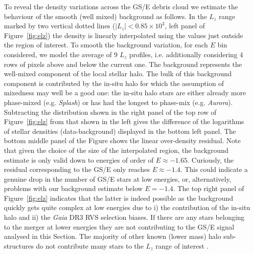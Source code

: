 \documentclass[a4paper,useAMS,usenatbib]{mnras}
\begin{document}
To reveal the density variations across the GS/E debris cloud we estimate the behaviour of the smooth (well mixed) background as follows. In the $L_z$ range marked by two vertical dotted lines ($|L_z|<0.85\times10^3$, left panel of Figure~\ref{fig:elz}) the density is linearly interpolated using the values just outside the region of interest. To smooth the background variation, for each $E$ bin considered, we model the average of 9 $L_z$ profiles, i.e. additionally considering 4 rows of pixels above and below the current one. The background represents the well-mixed component of the local stellar halo. The bulk of this background component is contributed by the in-situ halo for which the assumption of mixedness may well be a good one: the in-situ halo stars are either already more phase-mixed (e.g. {\it Splash}) or has had the longest to phase-mix (e.g. {\it Aurora}). Subtracting the distribution shown in the right panel of the top row of Figure~\ref{fig:elz} from that shown in the left gives the difference of the logarithms of stellar densities (data-background) displayed in the bottom left panel. The bottom middle panel of the Figure shows the linear over-density residual. Note that given the choice of the size of the interpolated region, the background estimate is only valid down to energies of order of $E\approx-1.65$. Curiously, the residual corresponding to the GS/E only reaches $E\approx-1.4$. This could indicate a genuine drop in the number of GS/E stars at low energies, or, alternatively, problems with our background estimate below $E=-1.4$. The top right panel of Figure~\ref{fig:elz} indicates that the latter is indeed possible as the background quickly gets quite complex at low energies due to i) the contribution of the in-situ halo and ii) the {\it Gaia} DR3 RVS selection biases. If there are any stars belonging to the merger at lower energies they are not contributing to the GS/E signal analysed in this Section. The majority of other known (lower mass) halo sub-structures do not contribute many stars to the $L_z$ range of interest \citep[e.g.][]{Myeong2018,Myeong2019,Koppelman2019b}.
\end{document}
